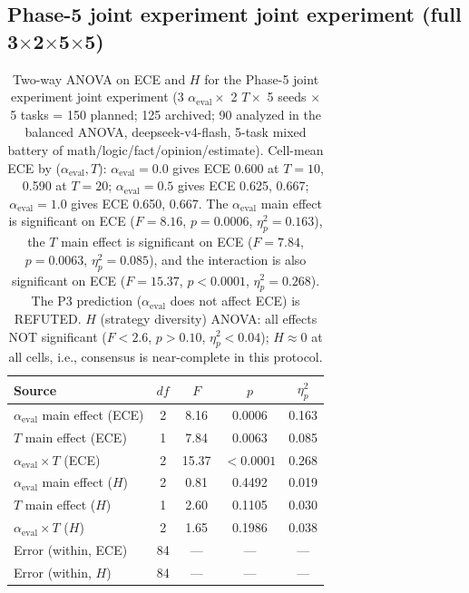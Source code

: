 \documentclass[11pt]{article}
\begin{document}
\subsection*{Phase-5 joint experiment joint experiment (full 3$\times$2$\times$5$\times$5)}
\begin{table}[h]
\centering
\caption{Two-way ANOVA on ECE and $H$ for the Phase-5 joint experiment joint experiment (3 $\alpha_{\text{eval}} \times$ 2 $T \times$ 5 seeds $\times$ 5 tasks = 150 planned; 125 archived; 90 analyzed in the balanced ANOVA, deepseek-v4-flash, 5-task mixed battery of math/logic/fact/opinion/estimate). Cell-mean ECE by ($\alpha_{\text{eval}}, T$): $\alpha_{\text{eval}}{=}0.0$ gives ECE 0.600 at $T{=}10$, 0.590 at $T{=}20$; $\alpha_{\text{eval}}{=}0.5$ gives ECE 0.625, 0.667; $\alpha_{\text{eval}}{=}1.0$ gives ECE 0.650, 0.667. The $\alpha_{\text{eval}}$ main effect is significant on ECE ($F = 8.16$, $p = 0.0006$, $\eta^2_p = 0.163$), the $T$ main effect is significant on ECE ($F = 7.84$, $p = 0.0063$, $\eta^2_p = 0.085$), and the interaction is also significant on ECE ($F = 15.37$, $p < 0.0001$, $\eta^2_p = 0.268$). The P3 prediction ($\alpha_{\text{eval}}$ does not affect ECE) is REFUTED. $H$ (strategy diversity) ANOVA: all effects NOT significant ($F < 2.6$, $p > 0.10$, $\eta^2_p < 0.04$); $H \approx 0$ at all cells, i.e., consensus is near-complete in this protocol.}
\label{tab:joint_full_v10}
\begin{tabular}{@{}lcccc@{}}
\toprule
\textbf{Source} & \textbf{$df$} & \textbf{$F$} & \textbf{$p$} & \textbf{$\eta^2_p$} \\
\midrule
$\alpha_{\text{eval}}$ main effect (ECE) & 2 & 8.16 & 0.0006 & 0.163 \\
$T$ main effect (ECE) & 1 & 7.84 & 0.0063 & 0.085 \\
$\alpha_{\text{eval}} \times T$ (ECE) & 2 & 15.37 & $< 0.0001$ & 0.268 \\
\midrule
$\alpha_{\text{eval}}$ main effect ($H$) & 2 & 0.81 & 0.4492 & 0.019 \\
$T$ main effect ($H$) & 1 & 2.60 & 0.1105 & 0.030 \\
$\alpha_{\text{eval}} \times T$ ($H$) & 2 & 1.65 & 0.1986 & 0.038 \\
\midrule
Error (within, ECE) & 84 & --- & --- & --- \\
Error (within, $H$) & 84 & --- & --- & --- \\
\bottomrule
\end{tabular}
\end{table}
\end{document}
